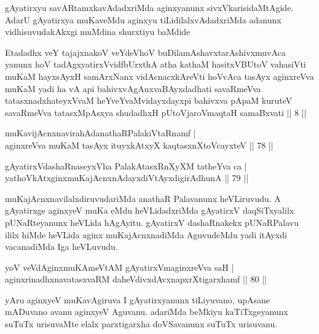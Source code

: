 \begin{artha} 
gAyatirxyu savARtamxkavAdadxriMda aginxyanunx sivxVkarisidaMtAgide. 
AdarU gAyatirxya muKaveMdu aginxyu tiLidilalxvAdadxriMda adanunx 
vidhisuvudakAkxgi muMdina shurxtiyu baMdide\\
\begin{shl}
Etadadhx veY tajajxnakoV veYdeVhoV buDilamAshavxtarAshivxmuvAca yanunx hoV tadAgxyatirxVvidfbUrxthA atha kathaM hasitxVBUtoV vahasiVti muKaM hayxsAyxH samArxNanx vidAcnacxkAreVti hoVvAca tasAyx aginxreVva muKaM yadi ha vA api bahivxvAgAnxvaBAyxdadhati savaRmeVva tatasxnadxhateyxVvaM heYveYvaMvidayxdayxpi bahivxva pApaM kuruteV savaRmeVva tatasxMpAsxya shudadhxH pUtoV\s jaroV\s maqtaH samaBxvati || 8 ||
\end{shl}
\end{artha}


\begin{shl}
muKavijAcnxnavirahAdanathaRPalakiVtaRnamf | \\
aginxreVva muKaM tasAyx ituyxkAtxyX kaqtasxnXtoVcayxteV \hfill||  78 || 
\end{shl}

\begin{shl}
gAyatirxVdashaRnaseyxVha PalakAtasxRnXyXM tatheYva ca | \\
yathoVkAtxginxmuKajAcnxnAdayxdiVtAyxdigirA\s dhunA \hfill||  79 || 
\end{shl}

\begin{artha} 
muKajAcnxnavilalxdiruvudariMda anathaR Palavanunx heVLiruvudu. A 
gAyatirxge aginxyeV muKa eMdu heVLidadxriMda gAyatirxV daqSiTxyalilx 
pUNaRteyanunx heVLida hAgAyitu. gAyatirxV dashaRnakekx pUNaRPalavu 
ililx hiMde heVLida aginx muKajAcnxnadiMda AguvudeMdu yadi itAyxdi 
vacanadiMda Iga heVLuvudu.
\end{artha}


\begin{shl}
yoV veVdAginxmuKAmeVtAM gAyatirxVmaginxreVva saH | \\
aginxrinadhxnavatasxvaRM daheVdivxdAvxnapxrXtigarxhamf \hfill||  80 || 
\end{shl}

\begin{artha} 
yAru aginxyeV muKavAgiruva I gAyatirxyanunx tiLiyuvano, upAsane 
mADuvano avanu aginxyeV Aguvanu. adariMda beMkiyu kaTiTxgeyanunx 
suTuTx urisuvaMte elalx parxtigarxha doVSavanunx suTuTx urisuvanu.
\end{artha}

